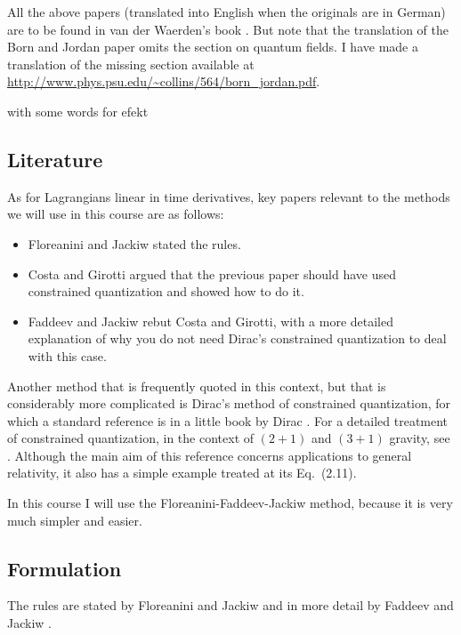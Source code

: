 \documentclass{article}
\begin{document}
All the above papers (translated into English when the originals are
in German) are to be found in van der Waerden's book \cite{Waerden}.
But note that the translation of the Born and Jordan paper omits the
section on quantum fields.  I have made a translation of the missing
section available at
\url{http://www.phys.psu.edu/~collins/564/born_jordan.pdf}.


with some words for efekt


\subsection{Literature}
As for Lagrangians linear in time derivatives, key papers relevant to
the methods we will use in this course are as follows:
\begin{itemize}
\item Floreanini and Jackiw \cite{Floreanini.Jackiw} stated the
  rules. 
\item Costa and Girotti \cite{Costa.Girotti} argued that the previous
  paper should have used constrained quantization and showed how to do
  it.
\item Faddeev and Jackiw \cite{Faddeev.Jackiw} rebut Costa and
  Girotti, with a more detailed explanation of why you do not need
  Dirac's constrained quantization to deal with this case.
\end{itemize}

Another method that is frequently quoted in this context, but that is
considerably more complicated is Dirac's method of constrained
quantization, for which a standard reference is in a little book by
Dirac \cite{Dirac.constrained}.  For a detailed treatment of
constrained quantization, in the context of $(2+1)$ and $(3+1)$
gravity, see \cite{Romano}.  Although the main aim of this reference
concerns applications to general relativity, it also has a simple
example treated at its Eq.\ (2.11).

In this course I will use the Floreanini-Faddeev-Jackiw method,
because it is very much simpler and easier.




\subsection{Formulation}
The rules are stated by Floreanini and Jackiw \cite{Floreanini.Jackiw}
and in more detail by Faddeev and Jackiw \cite{Faddeev.Jackiw}.
\end{document}
